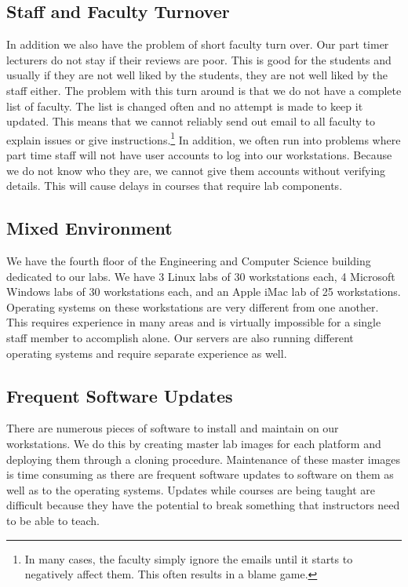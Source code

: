 \subsection{Staff and Faculty Turnover}
In addition we also have the problem of short faculty turn over.  Our part timer lecturers do not stay if their reviews are poor.  This is good for the students and usually if they are not well liked by the students, they are not well liked by the staff either.  The problem with this turn around is that we do not have a complete list of faculty.  The list is changed often and no attempt is made to keep it updated.  This means that we cannot reliably send out email to all faculty to explain issues or give instructions.\footnote{In many cases, the faculty simply ignore the emails until it starts to negatively affect them. This often results in a blame game.}  In addition, we often run into problems where part time staff will not have user accounts to log into our workstations.  Because we do not know who they are, we cannot give them accounts without verifying details.  This will cause delays in courses that require lab components. 

\subsection{Mixed Environment}
We have the fourth floor of the Engineering and Computer Science building dedicated to our labs.  We have 3 Linux labs of 30 workstations each, 4 Microsoft Windows labs of 30 workstations each, and an Apple iMac lab of 25 workstations.  Operating systems on these workstations are very different from one another.  This requires experience in many areas and is virtually impossible for a single staff member to accomplish alone.  Our servers are also running different operating systems and require separate experience as well.  

\subsection{Frequent Software Updates}
There are numerous pieces of software to install and maintain on our workstations.  We do this by creating master lab images for each platform and deploying them through a cloning procedure.  Maintenance of these master images is time consuming as there are frequent software updates to software on them as well as to the operating systems.  Updates while courses are being taught are difficult because they have the potential to break something that instructors need to be able to teach. 

